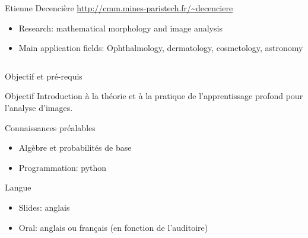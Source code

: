 \documentclass[xcolor=pdftex,dvipsnames,table,mathserif]{beamer}
\begin{document}
{\begin{columns}
\begin{column}{.8\textwidth}
    \begin{block}{Etienne Decencière \hfill \scriptsize{\url{http://cmm.mines-paristech.fr/\~decenciere}}}
      \scriptsize{
    \begin{itemize}
    \item Research: mathematical morphology and image analysis
    \item Main application fields: Ophthalmology, dermatology, cosmetology, astronomy
    \end{itemize}
    }
  \end{block}

  \end{column}
\end{columns}

}

\begin{frame}{Objectif et pré-requis}

\begin{block}{Objectif}
  Introduction à la théorie et à la pratique de l'apprentissage profond pour l'analyse d'images.
\end{block}

\begin{block}{Connaissances préalables}
\begin{itemize}
\item Algèbre et probabilités de base
\item Programmation: python
\end{itemize}
  \end{block}

  \begin{block}{Langue}
    \begin{itemize}
    \item Slides: anglais
    \item Oral: anglais ou français (en fonction de l'auditoire)
    \end{itemize}

\end{block}


\end{frame}
\end{document}
